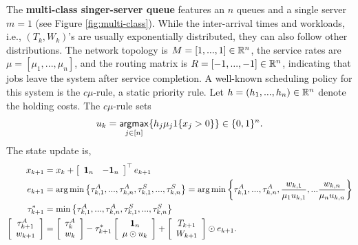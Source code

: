 \begin{example}
\label{example:multiclass}
The {\bf multi-class singer-server queue} features an $n$ queues and a single server $m=1$ (see Figure \ref{fig:multi-class}). While the inter-arrival times and workloads, i.e., $(T_{k}, W_{k})$'s are usually exponentially distributed, they can also follow other distributions. The network topology is $M=[1,...,1] \in \mathbb{R}^{n}$, the service rates are $\mu = [\mu_{1},...,\mu_{n}]$, and the routing matrix is $R =[-1,...,-1]\in \mathbb{R}^{n}$, indicating that jobs leave the system after service completion. 
A well-known scheduling policy for this system is the $c\mu$-rule, a static priority rule.
Let $h = (h_{1},...,h_{n}) \in \mathbb{R}^{n}$ denote the holding costs. The $c\mu$-rule sets
\[
    u_{k}=\mathop{\mathsf{argmax}}_{j\in [n]} \{ h_{j}\mu_{j}1\{x_{j}>0\} \}\in \{0,1\}^{n}.
\]
The state update is,
\begin{align*}
 x_{k+1}  &=x_{k}+\left[\begin{array}{cc}
\mathbf{1}_{n} & -\mathbf{1}_{n}
\end{array}\right]^{\top}e_{k+1}\\
e_{k+1} 
&=\arg\min\left\{ \tau_{k,1}^{A},...,\tau_{k,n}^{A},\tau_{k,1}^{S},...,\tau_{k,n}^{S} \right\} 
=\arg\min\left\{ \tau_{k,1}^{A},...,\tau_{k,n}^{A},
\frac{w_{k,1}}{\mu_{1} u_{k,1}},...
\frac{w_{k,n}}{\mu_{n} u_{k,n}}\right\} \\
\tau^{*}_{k+1} &= \min\left\{ \tau_{k,1}^{A},...,\tau_{k,n}^{A},\tau_{k,1}^{S},...,\tau_{k,n}^{S} \right\} \\
\left[
\begin{array}{c}
\tau_{k+1}^{A} \\
w_{k+1}
\end{array}
\right]
&= 
\left[
\begin{array}{c}
\tau_{k}^{A} \\
w_{k}
\end{array}
\right]
- \tau_{k+1}^{*}\left[
\begin{array}{c}
\mathbf{1}_{n} \\
\mu \odot u_{k}
\end{array}
\right] +
\left[
\begin{array}{c}
T_{k+1} \\
W_{k+1}
\end{array}
\right] \odot e_{k+1}.
\end{align*}
\end{example}


